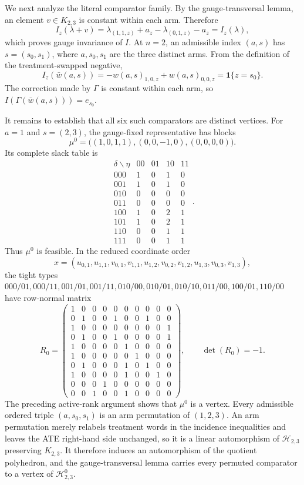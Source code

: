 We next analyze the literal comparator family. By the gauge-transversal lemma, an element \(v\in K_{2,3}\) is constant within each arm. Therefore
\[I_z(\lambda+v)=\lambda_{(1,1,z)}+a_z-\lambda_{(0,1,z)}-a_z=I_z(\lambda),\]
which proves gauge invariance of \(I\). At \(n=2\), an admissible index \((a,s)\) has \(s=(s_0,s_1)\), where \(a,s_0,s_1\) are the three distinct arms. From the definition of the treatment-swapped negative,
\[I_z(\bar w(a,s))=-w(a,s)_{1,0,z}+w(a,s)_{0,0,z}=\mathbf1\{z=s_0\}.\]
The correction made by \(\Gamma\) is constant within each arm, so \(I(\Gamma(\bar w(a,s)))=e_{s_0}\).

It remains to establish that all six such comparators are distinct vertices. For \(a=1\) and \(s=(2,3)\), the gauge-fixed representative has blocks
\[\mu^0=\bigl((1,0,1,1),(0,0,-1,0),(0,0,0,0)\bigr).\]
Its complete slack table is
\[\begin{array}{c|rrrr}\delta\backslash\eta&00&01&10&11\\ \hline 000&1&0&1&0\\ 001&1&0&1&0\\ 010&0&0&0&0\\ 011&0&0&0&0\\ 100&1&0&2&1\\ 101&1&0&2&1\\ 110&0&0&1&1\\ 111&0&0&1&1\end{array}.\]
Thus \(\mu^0\) is feasible. In the reduced coordinate order
\[x=(u_{0,1},u_{1,1},v_{0,1},v_{1,1},u_{1,2},v_{0,2},v_{1,2},u_{1,3},v_{0,3},v_{1,3}),\]
the tight types \(000/01,000/11,001/01,001/11,010/00,010/01,010/10,011/00,100/01,110/00\) have row-normal matrix
\[R_0=\begin{pmatrix}1&0&0&0&0&0&0&0&0&0\\ 0&1&0&0&1&0&0&1&0&0\\ 1&0&0&0&0&0&0&0&0&1\\ 0&1&0&0&1&0&0&0&0&1\\ 1&0&0&0&0&1&0&0&0&0\\ 1&0&0&0&0&0&1&0&0&0\\ 0&1&0&0&0&1&0&1&0&0\\ 1&0&0&0&0&1&0&0&1&0\\ 0&0&0&1&0&0&0&0&0&0\\ 0&0&1&0&0&1&0&0&0&0\end{pmatrix},\qquad\det(R_0)=-1.\]
The preceding active-rank argument shows that \(\mu^0\) is a vertex. Every admissible ordered triple \((a,s_0,s_1)\) is an arm permutation of \((1,2,3)\). An arm permutation merely relabels treatment words in the incidence inequalities and leaves the ATE right-hand side unchanged, so it is a linear automorphism of \(\mathcal H_{2,3}\) preserving \(K_{2,3}\). It therefore induces an automorphism of the quotient polyhedron, and the gauge-transversal lemma carries every permuted comparator to a vertex of \(\mathcal H^0_{2,3}\).


